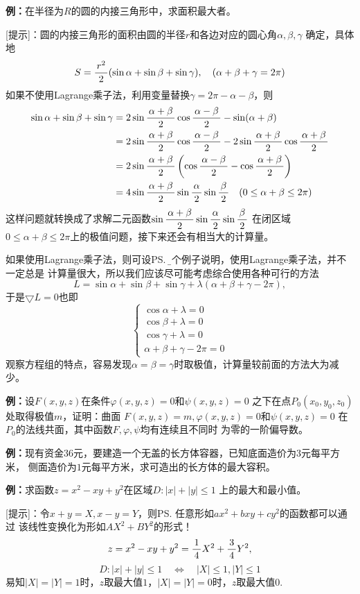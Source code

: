 {\bf 例：}在半径为$R$的圆的内接三角形中，求面积最大者。

[提示]：圆的内接三角形的面积由圆的半径$r$和各边对应的圆心角$\alpha,\beta,\gamma$
确定，具体地
$$S=\displaystyle\frac{\,{r^2}\,}{\,{2}\,}(\sin\alpha+\sin\beta+\sin\gamma),\quad
(\alpha+\beta+\gamma=2\pi)$$
如果不使用Lagrange乘子法，利用变量替换$\gamma=2\pi-\alpha-\beta$，则
\begin{align*}
	\sin\alpha+\sin\beta+\sin\gamma
	&=2\sin\displaystyle\frac{\,{\alpha+\beta}\,}{\,{2}\,}\cos\displaystyle\frac{\,{\alpha-\beta}\,}{\,{2}\,}-\sin(\alpha+\beta)\\
	&=2\sin\displaystyle\frac{\,{\alpha+\beta}\,}{\,{2}\,}\cos\displaystyle\frac{\,{\alpha-\beta}\,}{\,{2}\,}-2\sin\displaystyle\frac{\,{\alpha+\beta}\,}{\,{2}\,}
	\cos\displaystyle\frac{\,{\alpha+\beta}\,}{\,{2}\,}\\
	&=2\sin\displaystyle\frac{\,{\alpha+\beta}\,}{\,{2}\,}\left(\cos\displaystyle\frac{\,{\alpha-\beta}\,}{\,{2}\,}
	-\cos\displaystyle\frac{\,{\alpha+\beta}\,}{\,{2}\,}\right)\\
	&=4\sin\displaystyle\frac{\,{\alpha+\beta}\,}{\,{2}\,}\sin\displaystyle\frac{\,{\alpha}\,}{\,{2}\,}\sin\displaystyle\frac{\,{\beta}\,}{\,{2}\,}
	\quad(0\leq\alpha+\beta\leq2\pi)
\end{align*}
这样问题就转换成了求解二元函数$\sin\displaystyle\frac{\,{\alpha+\beta}\,}{\,{2}\,}\sin\displaystyle\frac{\,{\alpha}\,}{\,{2}\,}\sin\displaystyle\frac{\,{\beta}\,}{\,{2}\,}$
在闭区域$0\leq\alpha+\beta\leq2\pi$上的极值问题，接下来还会有相当大的计算量。

如果使用Lagrange乘子法，则可设\ps{\b 这个例子说明，使用Lagrange乘子法，并不一定总是
计算量很大，所以我们应该尽可能考虑综合使用各种可行的方法}
$$L=\sin\alpha+\sin\beta+\sin\gamma+\lambda(\alpha+\beta+\gamma-2\pi),$$
于是$\bigtriangledown L=0$也即
$$
	\left\{\begin{array}{l}
		\cos\alpha+\lambda=0\\
		\cos\beta+\lambda=0\\
		\cos\gamma+\lambda=0\\
		\alpha+\beta+\gamma-2\pi=0
	\end{array}\right.
$$
观察方程组的特点，容易发现$\alpha=\beta=\gamma$时取极值，计算量较前面的方法大为减少。

{\bf 例：}设$F(x,y,z)$在条件$\varphi(x,y,z)=0$和$\psi(x,y,z)=0$
之下在点$P_0(x_0,y_0,z_0)$处取得极值$m$，证明：曲面
$F(x,y,z)=m,\varphi(x,y,z)=0$和$\psi(x,y,z)=0$
在$P_0$的法线共面，其中函数$F,\varphi,\psi$均有连续且不同时
为零的一阶偏导数。

{\bf 例：}现有资金$36$元，要建造一个无盖的长方体容器，已知底面造价为$3$元每平方米，
侧面造价为$1$元每平方米，求可造出的长方体的最大容积。

{\bf 例：}求函数$z=x^2-xy+y^2$在区域$D:|x|+|y|\leq 1$
上的最大和最小值。

[提示]：令$x+y=X,x-y=Y$，则\ps{任意形如$ax^2+bxy+cy^2$的函数都可以通过
该线性变换化为形如$AX^2+BY^2$的形式！}
$$z=x^2-xy+y^2=\displaystyle\frac{\,{1}\,}{\,{4}\,}X^2+\displaystyle\frac{\,{3}\,}{\,{4}\,}Y^2,$$
$$D:|x|+|y|\leq 1\quad\Leftrightarrow\quad |X|\leq1,|Y|\leq1$$
易知$|X|=|Y|=1$时，$z$取最大值$1$，$|X|=|Y|=0$时，$z$取最大值$0$.

